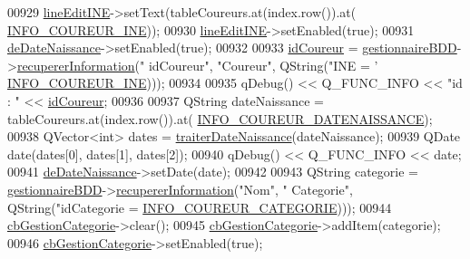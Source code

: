 \begin{DoxyCode}
00929     \hyperlink{class_i_h_m_gestion_cross_ab6c32fd079f81c4fa0b9ec0b4ef9bb61}{lineEditINE}->setText(tableCoureurs.at(index.row()).at(
      \hyperlink{ihmgestioncross_8h_a2e5435ad2b0c61674b2dad6c0ea46301}{INFO\_COUREUR\_INE}));
00930     \hyperlink{class_i_h_m_gestion_cross_ab6c32fd079f81c4fa0b9ec0b4ef9bb61}{lineEditINE}->setEnabled(\textcolor{keyword}{true});
00931     \hyperlink{class_i_h_m_gestion_cross_a1c63c5c91be88aef13d2582e48dff7d0}{deDateNaissance}->setEnabled(\textcolor{keyword}{true});
00932 
00933     \hyperlink{class_i_h_m_gestion_cross_a9352a649126c14e7d0da3694c10c3cef}{idCoureur} = \hyperlink{class_i_h_m_gestion_cross_a440bac63a3e51db3e2c08e883f8cafc9}{gestionnaireBDD}->\hyperlink{class_gestion_b_d_d_a0a2fa02b90974684658937fbfb55bf0a}{recupererInformation}(\textcolor{stringliteral}{"
      idCoureur"}, \textcolor{stringliteral}{"Coureur"}, QString(\textcolor{stringliteral}{"INE = '%
      \hyperlink{ihmgestioncross_8h_a2e5435ad2b0c61674b2dad6c0ea46301}{INFO\_COUREUR\_INE})));
00934 
00935     qDebug() << Q\_FUNC\_INFO << \textcolor{stringliteral}{"id : "} << \hyperlink{class_i_h_m_gestion_cross_a9352a649126c14e7d0da3694c10c3cef}{idCoureur};
00936 
00937     QString dateNaissance = tableCoureurs.at(index.row()).at(
      \hyperlink{ihmgestioncross_8h_a887f2ea4595905eedb8c2580dad1c276}{INFO\_COUREUR\_DATENAISSANCE});
00938     QVector<int> dates = \hyperlink{class_i_h_m_gestion_cross_a4846dcb0c5f95b2b774ab328654bf716}{traiterDateNaissance}(dateNaissance);
00939     QDate date(dates[0], dates[1], dates[2]);
00940     qDebug() << Q\_FUNC\_INFO << date;
00941     \hyperlink{class_i_h_m_gestion_cross_a1c63c5c91be88aef13d2582e48dff7d0}{deDateNaissance}->setDate(date);
00942 
00943     QString categorie = \hyperlink{class_i_h_m_gestion_cross_a440bac63a3e51db3e2c08e883f8cafc9}{gestionnaireBDD}->\hyperlink{class_gestion_b_d_d_a0a2fa02b90974684658937fbfb55bf0a}{recupererInformation}(\textcolor{stringliteral}{"Nom"}, \textcolor{stringliteral}{"
      Categorie"}, QString(\textcolor{stringliteral}{"idCategorie = %
      \hyperlink{ihmgestioncross_8h_aadb5aa9454077354c643312a81834cf6}{INFO\_COUREUR\_CATEGORIE})));
00944     \hyperlink{class_i_h_m_gestion_cross_a60cdc44c61bcd4e1e189c8de5556b89e}{cbGestionCategorie}->clear();
00945     \hyperlink{class_i_h_m_gestion_cross_a60cdc44c61bcd4e1e189c8de5556b89e}{cbGestionCategorie}->addItem(categorie);
00946     \hyperlink{class_i_h_m_gestion_cross_a60cdc44c61bcd4e1e189c8de5556b89e}{cbGestionCategorie}->setEnabled(\textcolor{keyword}{true});
}}
\end{DoxyCode}
